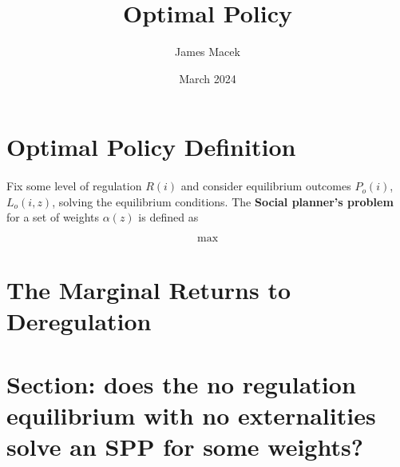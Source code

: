\documentclass[11pt]{article}
\title{Optimal Policy}
\author{James Macek}
\date{March 2024}
\begin{document}
	
	\maketitle

	
	\section{Optimal Policy Definition}
	\paragraph*{}
	Fix some level of regulation $R(i)$ and consider equilibrium outcomes $P_{o}(i)$, $L_{o}(i, z)$, solving the equilibrium conditions. The \textbf{Social planner's problem} for a set of weights $\alpha(z)$ is defined as 
	
	\begin{equation*}
		\max_{}
	\end{equation*}
	
	
	
	\section{The Marginal Returns to Deregulation}
	
	\section{Section: does the no regulation equilibrium with no externalities solve an SPP for some weights?}
	
	\section{}
	
	\paragraph*{}
	
	
	
	
	
		
\end{document}
